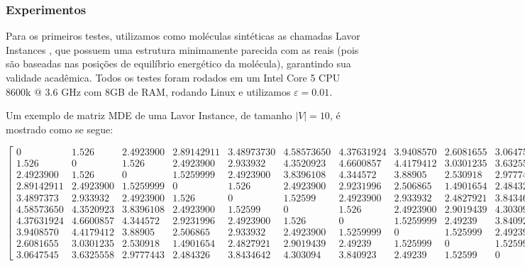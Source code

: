 \documentclass[a4paper,12pt]{article}
\begin{document}
	\subsubsection{Experimentos}
	Para os primeiros testes, utilizamos como moléculas sintéticas as chamadas Lavor Instances \cite{carlile:instancesMDGP}, que possuem uma estrutura minimamente parecida com as reais (pois são baseadas nas posições de equilíbrio energético da molécula), garantindo sua validade acadêmica. Todos os testes foram rodados em um Intel Core 5 CPU 8600k @ 3.6 GHz com 8GB de RAM, rodando Linux e utilizamos $\varepsilon = 0.01$.
	
	Um exemplo de matriz MDE de uma Lavor Instance, de tamanho $|V| = 10$, é mostrado como se segue: 
	\\
	
	\begin{footnotesize}
		\hspace{-2.6cm}
		$
		\begin{bmatrix}
		0 & 1.526 & 2.4923900 & 2.89142911 & 3.48973730 & 4.58573650 & 4.37631924 & 3.9408570 & 2.6081655 & 3.0647545\\
		1.526 & 0 & 1.526 & 2.4923900 & 2.933932 & 4.3520923 & 4.6600857 & 4.4179412 & 3.0301235 & 3.6325558\\
		2.4923900 & 1.526 & 0 & 1.5259999 & 2.4923900 & 3.8396108 & 4.344572 & 3.88905 & 2.530918 & 2.9777443\\
		2.89142911 & 2.4923900 & 1.5259999 & 0 & 1.526 & 2.4923900 & 2.9231996 & 2.506865 & 1.4901654 & 2.484326\\
		3.4897373 & 2.933932 & 2.4923900 & 1.526 & 0 & 1.52599 & 2.4923900 & 2.933932 & 2.4827921 & 3.8434642\\
		4.58573650 & 4.3520923 & 3.8396108 & 2.4923900 & 1.52599 & 0 & 1.526 & 2.4923900 & 2.9019439 & 4.303094\\
		4.37631924 & 4.6600857 & 4.344572 & 2.9231996 & 2.4923900 & 1.526 & 0 & 1.5259999 & 2.49239 & 3.840923\\
		3.9408570 & 4.4179412 & 3.88905 & 2.506865 & 2.933932 & 2.4923900 & 1.5259999 & 0 & 1.525999 & 2.49239\\
		2.6081655 & 3.0301235 & 2.530918 & 1.4901654 & 2.4827921 & 2.9019439 & 2.49239 & 1.525999 & 0 & 1.52599\\
		3.0647545 & 3.6325558 & 2.9777443 & 2.484326 & 3.8434642 & 4.303094 & 3.840923 & 2.49239 & 1.52599 & 0 
		\end{bmatrix}
		$
	\end{footnotesize}
	\\
	
\end{document}
